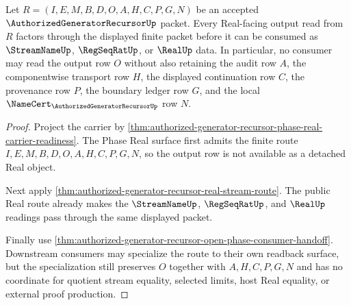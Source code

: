 \begin{theorem}
\label{thm:authorized-generator-recursor-real-output-factorization-lock}
Let $R=(I,E,M,B,D,O,A,H,C,P,G,N)$ be an accepted $\AuthorizedGeneratorRecursorUp$ packet. Every Real-facing output read from $R$ factors through the displayed finite packet before it can be consumed as $\StreamNameUp$, $\RegSeqRatUp$, or $\RealUp$ data. In particular, no consumer may read the output row $O$ without also retaining the audit row $A$, the componentwise transport row $H$, the displayed continuation row $C$, the provenance row $P$, the boundary ledger row $G$, and the local $\NameCert_{\AuthorizedGeneratorRecursorUp}$ row $N$.
\end{theorem}
\begin{proof}
Project the carrier by \autoref{thm:authorized-generator-recursor-phase-real-carrier-readiness}. The Phase Real surface first admits the finite route $I,E,M,B,D,O,A,H,C,P,G,N$, so the output row is not available as a detached Real object.

Next apply \autoref{thm:authorized-generator-recursor-real-stream-route}. The public Real route already makes the $\StreamNameUp$, $\RegSeqRatUp$, and $\RealUp$ readings pass through the same displayed packet.

Finally use \autoref{thm:authorized-generator-recursor-open-phase-consumer-handoff}. Downstream consumers may specialize the route to their own readback surface, but the specialization still preserves $O$ together with $A,H,C,P,G,N$ and has no coordinate for quotient stream equality, selected limits, host Real equality, or external proof production.
\end{proof}

